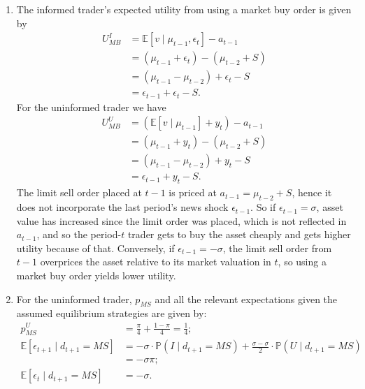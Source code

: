 \documentclass[a4paper]{article}
\begin{document}
\begin{enumerate}
	\item The informed trader's expected utility from using a market buy order is given by
	\begin{align}
		U^I_{MB}
		&= \mathbb{E}[v \mid \mu_{t-1},\epsilon_{t}] - a_{t-1} 
		\nonumber
		\\
		&= (\mu_{t-1} + \epsilon_t) - (\mu_{t-2} + S)
		\nonumber
		\\
		&= (\mu_{t-1} - \mu_{t-2}) + \epsilon_t - S
		\nonumber
		\\
		&= \epsilon_{t-1} + \epsilon_t - S.
		\label{eq:uimb}
	\end{align}
	For the uninformed trader we have
	\begin{align}
		U^U_{MB}
		&= (\mathbb{E}[v \mid \mu_{t-1}] + y_t) - a_{t-1} 
		\nonumber
		\\
		&= (\mu_{t-1} + y_t) - (\mu_{t-2} + S)
		\nonumber
		\\
		&= (\mu_{t-1} - \mu_{t-2}) + y_t - S
		\nonumber
		\\
		&= \epsilon_{t-1} + y_t - S.
		\label{eq:uumb}
	\end{align}
	The limit sell order placed at $t-1$ is priced at $a_{t-1} = \mu_{t-2} + S$, hence it does not incorporate the last period's news shock $\epsilon_{t-1}$. So if $\epsilon_{t-1}=\sigma$, asset value has increased since the limit order was placed, which is not reflected in $a_{t-1}$, and so the period-$t$ trader gets to buy the asset cheaply and gets higher utility because of that. Conversely, if $\epsilon_{t-1}=-\sigma$, the limit sell order from $t-1$ overprices the asset relative to its market valuation in $t$, so using a market buy order yields lower utility.
	
	\item For the uninformed trader, $p_{MS}$ and all the relevant expectations given the assumed equilibrium strategies are given by:
	\begin{align}
		p_{MS}^U &= \frac{\pi}{4} + \frac{1-\pi}{4} = \frac{1}{4};
		\label{eq:pums}
		\\
		\mathbb{E}[\epsilon_{t+1} \mid d_{t+1}=MS] &= -\sigma \cdot \mathbb{P}(I \mid d_{t+1}=MS) + \frac{\sigma - \sigma}{2} \cdot \mathbb{P}(U \mid d_{t+1}=MS)
		\nonumber
		\\
		&= -\sigma \pi;
		\label{eq:eut+1}
		\\
		\mathbb{E}[\epsilon_{t} \mid d_{t+1}=MS] &=  -\sigma .
		\label{eq:eut}
	\end{align}
	

\end{enumerate}
\end{document}

